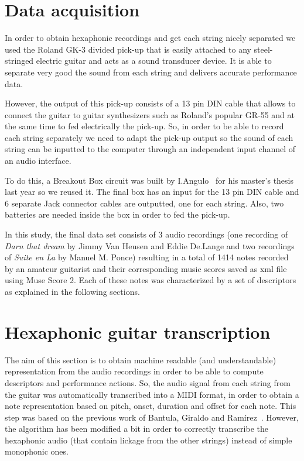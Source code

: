 \section{Data acquisition}
In order to obtain hexaphonic recordings and get each string nicely separated we used the Roland GK-3 divided pick-up that is easily attached to any steel-stringed electric guitar and acts as a sound transducer device. It is able to separate very good the sound from each string and delivers accurate performance data.

However, the output of this pick-up consists of a 13 pin DIN cable that allows to connect the guitar to guitar synthesizers such as Roland's popular GR-55 and at the same time to fed electrically the pick-up. So, in order to be able to record each string separately we need to adapt the pick-up output so the sound of each string can be inputted to the computer through an independent input channel of an audio interface.

To do this, a Breakout Box circuit was built by I.Angulo~\cite{Angulo2016} for his master's thesis last year so we reused it. The final box has an input for the 13 pin DIN cable and 6 separate Jack connector cables are outputted, one for each string. Also, two batteries are needed inside the box in order to fed the pick-up. 

In this study, the final data set consists of 3 audio recordings (one recording of \textit{Darn that dream} by Jimmy Van Heusen and Eddie De.Lange and two recordings of \textit{Suite en La} by Manuel M. Ponce) resulting in a total of 1414 notes recorded by an amateur guitarist and their corresponding music scores saved as xml file using Muse Score 2. Each of these notes was characterized by a set of descriptors as explained in the following sections.  

\section{Hexaphonic guitar transcription}
The aim of this section is to obtain machine readable (and understandable) representation from the audio recordings in order to be able to compute descriptors and performance actions. So, the audio signal from each string from the guitar was automatically transcribed into a MIDI format, in order to obtain a note representation based on pitch, onset, duration and offset for each note. This step was based on the previous work of Bantula, Giraldo and Ramírez~\cite{bantula2016}. However, the algorithm has been modified a bit in order to correctly transcribe the hexaphonic audio (that contain lickage from the other strings) instead of simple monophonic ones.

